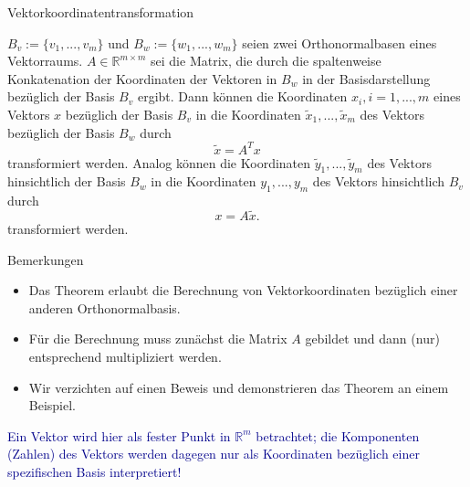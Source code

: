 \documentclass[
  8pt,
  ignorenonframetext,
]{beamer}
\providecommand{\tightlist}{%
  \setlength{\itemsep}{0pt}\setlength{\parskip}{0pt}}
\begin{document}
\begin{frame}{Vektorkoordinatentransformation}
\protect\hypertarget{vektorkoordinatentransformation-4}{}
\footnotesize
\begin{theorem}[Vektorkoordinatentransformation]
\justifying
\normalfont
$B_v := \{v_1,...,v_m\}$ und $B_w := \{w_1,...,w_m\}$ seien zwei Orthonormalbasen
eines Vektorraums. $A \in \mathbb{R}^{m \times m}$ sei die Matrix, die durch die
spaltenweise Konkatenation der Koordinaten der Vektoren in $B_w$ in der Basisdarstellung
bezüglich der Basis $B_v$ ergibt. Dann können die Koordinaten $x_i, i = 1,...,m$
eines Vektors $x$ bezüglich der Basis $B_v$ in die Koordinaten $\tilde{x}_1,...,\tilde{x}_m$
des Vektors bezüglich der Basis $B_w$  durch
\begin{equation}
\tilde{x} = A^T x
\end{equation}
transformiert werden. Analog können die Koordinaten $\tilde{y}_1,...,\tilde{y}_m$
des Vektors hinsichtlich der Basis $B_w$ in die Koordinaten $y_1,...,y_m$ des
Vektors hinsichtlich $B_v$ durch
\begin{equation}
x = A \tilde{x}.
\end{equation}
transformiert werden.
\end{theorem}

\footnotesize

Bemerkungen

\begin{itemize}
\tightlist
\item
  \justifying Das Theorem erlaubt die Berechnung von Vektorkoordinaten
  bezüglich einer anderen Orthonormalbasis.
\item
  Für die Berechnung muss zunächst die Matrix \(A\) gebildet und dann
  (nur) entsprechend multipliziert werden.
\item
  Wir verzichten auf einen Beweis und demonstrieren das Theorem an einem
  Beispiel.
\end{itemize}

\small
\center

\textcolor{darkblue}{Ein Vektor wird hier als  fester Punkt in $\mathbb{R}^m$ betrachtet; die Komponenten (Zahlen) des Vektors werden dagegen nur als Koordinaten bezüglich einer spezifischen Basis interpretiert!}
\end{frame}
\end{document}
